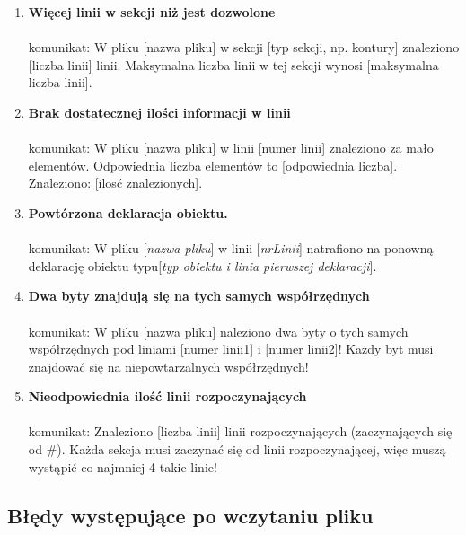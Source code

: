 \documentclass[hidelinks,10pt,a4paper]{article}
\begin{document}
\begin{enumerate}
\item \textbf{Więcej linii w sekcji niż jest dozwolone}
\\\\komunikat: W pliku [nazwa pliku] w sekcji [typ sekcji, np. kontury] znaleziono [liczba linii] linii. Maksymalna liczba linii w tej sekcji wynosi [maksymalna liczba linii].

\item \textbf{Brak dostatecznej ilości informacji w linii}
\\\\komunikat: W pliku [nazwa pliku] w linii [numer linii] znaleziono za mało elementów. Odpowiednia liczba elementów to [odpowiednia liczba]. Znaleziono: [ilosć znalezionych].

\item \textbf{Powtórzona deklaracja obiektu.}
\\
\\komunikat: W pliku [\textit{nazwa pliku}] w linii [\textit{nrLinii}] natrafiono na ponowną deklarację obiektu typu[\textit{typ obiektu i linia pierwszej deklaracji}].

\item \textbf{Dwa byty znajdują się na tych samych współrzędnych}
\\
\\komunikat: W pliku [nazwa pliku] naleziono dwa byty o tych samych współrzędnych pod liniami [numer linii1] i [numer linii2]! Każdy byt musi znajdować się na niepowtarzalnych współrzędnych!

\item \textbf{Nieodpowiednia ilość linii rozpoczynających}
\\\\komunikat: Znaleziono [liczba linii] linii rozpoczynających (zaczynających się od \#). Każda sekcja musi zaczynać się od linii rozpoczynającej, więc muszą wystąpić co najmniej 4 takie linie!

\end{enumerate}

\subsection{Błędy występujące po wczytaniu pliku}
\end{document}
